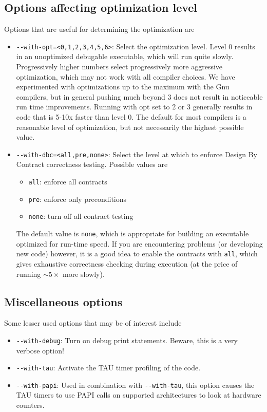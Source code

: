 \documentclass{article}
\begin{document}
\subsection{Options affecting optimization level}
Options that are useful for determining the optimization are
\begin{itemize}
\item \verb+--with-opt=<0,1,2,3,4,5,6>+: Select the optimization level.  Level 0
results in an unoptimized debugable executable, which will run quite slowly.
Progressively higher numbers select progressively more aggressive optimization,
which may not work with all compiler choices.  We have experimented with
optimizations up to the maximum with the Gnu compilers, but in general pushing
much beyond 3 does not result in noticeable run time improvements.  Running with
opt set to 2 or 3 generally results in code that is 5-10x faster than level 0.
The default for most compilers is a reasonable level of optimization, but not
necessarily the highest possible value.
\item \verb+--with-dbc=<all,pre,none>+: Select the level at which to enforce
Design By Contract correctness testing.  Possible values are
\begin{itemize}
\item \verb+all+: enforce all contracts
\item \verb+pre+: enforce only preconditions
\item \verb+none+: turn off all contract testing
\end{itemize}
The default value is \verb+none+, which is appropriate for building an
executable optimized for run-time speed.  If you are encountering problems (or
developing new code) however, it is a good idea to enable the contracts with
\verb+all+, which gives exhaustive correctness checking during execution (at the
price of running $\sim 5\times$ more slowly).
\end{itemize}

\subsection{Miscellaneous options}
Some lesser used options that may be of interest include
\begin{itemize}
\item \verb+--with-debug+: Turn on debug print statements.  Beware, this is a
very verbose option!
\item \verb+--with-tau+: Activate the TAU timer profiling of the code.
\item \verb+--with-papi+: Used in combination with \verb+--with-tau+, this
  option causes the TAU timers to use PAPI calls on supported architectures to
  look at hardware counters.
\end{itemize}
\end{document}
